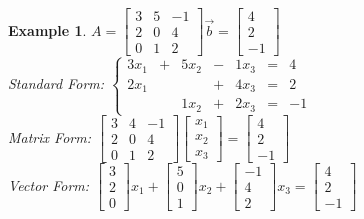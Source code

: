 \documentclass[a4paper,12pt,openany]{book}
\theoremstyle{defn}
\theoremstyle{expl}
\newtheorem{expl}{Example}[section]
\begin{document}
\begin{expl}
\textup{
$A = \left[\begin{array}{ccc}3&5&-1\\2&0&4\\0&1&2\end{array}\right] \vec{b}=\left[\begin{array}{c}4\\2\\-1\end{array}\right]$\\
Standard Form: $\left\{\begin{array}{ccccccc}
3x_1&+&5x_2&-&1x_3&=&4\\
2x_1&&&+&4x_3&=&2\\
&&1x_2&+&2x_3&=&-1
\end{array}
 \right.$\\
Matrix Form: $\left[\begin{array}{ccc}3&4&-1\\2&0&4\\0&1&2\end{array} \right]\left[\begin{array}{c}x_1\\x_2\\x_3\end{array} \right] = \left[\begin{array}{c}4\\2\\-1\end{array} \right]$\\
Vector Form: $\left[\begin{array}{c}3\\2\\0\end{array}\right]x_1+\left[\begin{array}{c}5\\0\\1\end{array}\right]x_2+\left[\begin{array}{c}-1\\4\\2\end{array}\right]x_3=\left[\begin{array}{c}4\\2\\-1\end{array}\right]$
}\end{expl}
\end{document}
